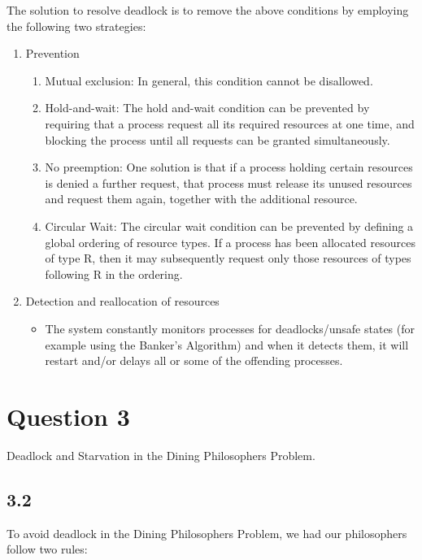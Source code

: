 \documentclass[11pt, letterpaper]{article}
\begin{document}
The solution to resolve deadlock is to remove the above conditions by employing the following two strategies:

\begin{enumerate}
    \item Prevention
        \begin{enumerate}[label=\arabic*.]
            \item Mutual exclusion: In general, this condition cannot be disallowed.
            \item Hold-and-wait: The hold and-wait condition can be prevented by requiring that a process request all its required resources at one time, and blocking the process until all requests can be granted simultaneously.
            \item No preemption: One solution is that if a process holding certain resources is denied a further request, that process must release its unused resources and request them again, together with the additional resource.
            \item Circular Wait: The circular wait condition can be prevented by defining a global ordering of resource types. If a process has been allocated resources of type R, then it may subsequently request only those resources of types following R in the ordering.
        \end{enumerate}
    \item Detection and reallocation of resources
        \begin{itemize}
            \item The system constantly monitors processes for deadlocks/unsafe states (for example using the Banker’s Algorithm) and when it detects them, it will restart and/or delays all or some of the offending processes.
        \end{itemize}
\end{enumerate}
\pagebreak

\section*{Question 3}

Deadlock and Starvation in the Dining Philosophers Problem.

\subsection*{3.2}

To avoid deadlock in the Dining Philosophers Problem, we had our philosophers follow two rules:
\end{document}
